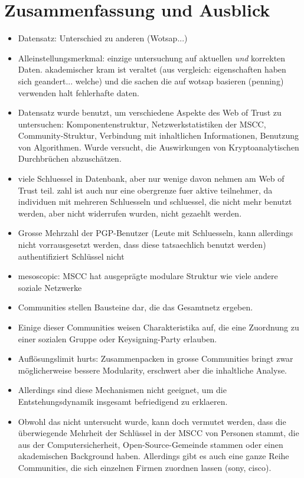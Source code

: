 
\chapter{Zusammenfassung und Ausblick}
\label{ch:Zusammenfassung}

\begin{itemize}

\item Datensatz: Unterschied zu anderen (Wotsap...)

\item Alleinstellungsmerkmal: einzige untersuchung auf aktuellen
  \emph{und} korrekten Daten. akademischer kram ist veraltet (aus
  vergleich: eigenschaften haben sich geandert... welche) und die
  sachen die auf wotsap basieren (penning) verwenden halt fehlerhafte
  daten.
\item Datensatz wurde benutzt, um verschiedene Aspekte des Web of
  Trust zu untersuchen: Komponentenstruktur, Netzwerkstatistiken der
  MSCC, Community-Struktur, Verbindung mit inhaltlichen Informationen,
  Benutzung von Algorithmen. Wurde versucht, die Auswirkungen von
  Kryptoanalytischen Durchbr\"uchen abzusch\"atzen.

\item viele Schluessel in Datenbank, aber nur wenige davon nehmen am
  Web of Trust teil. zahl ist auch nur eine obergrenze fuer aktive
  teilnehmer, da individuen mit mehreren Schluesseln und schluessel,
  die nicht mehr benutzt werden, aber nicht widerrufen wurden, nicht
  gezaehlt werden.
\item Grosse Mehrzahl der PGP-Benutzer (Leute mit Schluesseln,
  kann allerdings nicht vorrausgesetzt werden, dass diese tatsaechlich
  benutzt werden) authentifiziert Schl\"ussel nicht
\item mesoscopic: MSCC hat ausgepr\"agte modulare Struktur wie viele andere
  soziale Netzwerke
\item Communities stellen Bausteine dar, die das Gesamtnetz ergeben.
\item Einige dieser Communities weisen Charakteristika auf, die eine
  Zuordnung zu einer sozialen Gruppe oder Keysigning-Party erlauben.
\item Aufl\"osungslimit hurts: Zusammenpacken in grosse Communities
  bringt zwar m\"oglicherweise bessere Modularity, erschwert aber die
  inhaltliche Analyse.
\item Allerdings sind diese Mechanismen nicht geeignet, um die
  Entstehungsdynamik insgesamt befriedigend zu erklaeren.
\item Obwohl das nicht untersucht wurde, kann doch vermutet werden,
  dass die \"uberwiegende Mehrheit der Schl\"ussel in der MSCC von
  Personen stammt, die aus der Computersicherheit,  Open-Source-Gemeinde stammen oder einen
  akademischen Background haben. Allerdings gibt es auch eine ganze
  Reihe Communities, die sich einzelnen Firmen zuordnen lassen (sony,
  cisco). 

\end{itemize}

